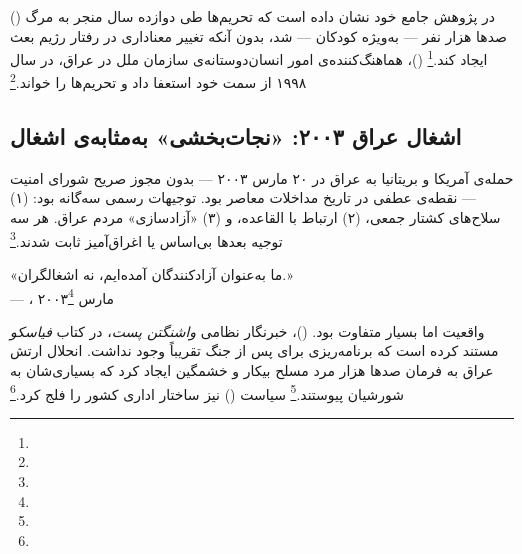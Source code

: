  () در پژوهش جامع خود نشان داده است که تحریم‌ها طی دوازده سال منجر به مرگ صدها هزار نفر — به‌ویژه کودکان — شد، بدون آنکه تغییر معناداری در رفتار رژیم بعث ایجاد کند.\footnote{}  ()، هماهنگ‌کننده‌ی امور انسان‌دوستانه‌ی سازمان ملل در عراق، در سال ۱۹۹۸ از سمت خود استعفا داد و تحریم‌ها را  خواند.\footnote{}

\subsection{اشغال عراق ۲۰۰۳: «نجات‌بخشی» به‌مثابه‌ی اشغال}
\label{subsec:ch10-iraq-2003}

حمله‌ی آمریکا و بریتانیا به عراق در ۲۰ مارس ۲۰۰۳ — بدون مجوز صریح شورای امنیت — نقطه‌ی عطفی در تاریخ مداخلات معاصر بود. توجیهات رسمی سه‌گانه بود: (۱) سلاح‌های کشتار جمعی، (۲) ارتباط با القاعده، و (۳) «آزادسازی» مردم عراق. هر سه توجیه بعدها بی‌اساس یا اغراق‌آمیز ثابت شدند.\footnote{}

\begin{tcolorbox}[quotebox, title={نقل‌قول تاریخی}]
«ما به‌عنوان آزادکنندگان آمده‌ایم، نه اشغالگران.»\\
— ، مارس ۲۰۰۳\footnote{}
\end{tcolorbox}

واقعیت اما بسیار متفاوت بود.  ()، خبرنگار نظامی \textit{واشنگتن پست}، در کتاب \textit{فیاسکو} مستند کرده است که برنامه‌ریزی برای پس از جنگ تقریباً وجود نداشت. انحلال ارتش عراق به فرمان  صدها هزار مرد مسلح بیکار و خشمگین ایجاد کرد که بسیاری‌شان به شورشیان پیوستند.\footnote{} سیاست  () نیز ساختار اداری کشور را فلج کرد.\footnote{}

